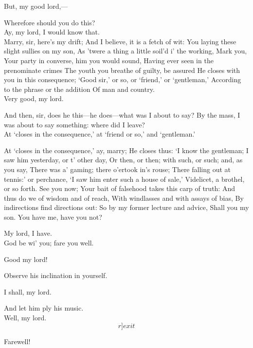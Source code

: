\documentclass[11pt]{book}
\begin{document}
	But, my good lord,---

\5	Wherefore should you do this?\\

	Ay, my lord,
	I would know that.\\

\5	                  Marry, sir, here's my drift;
	And I believe, it is a fetch of wit:
	You laying these slight sullies on my son,
	As 'twere a thing a little soil'd i' the working, Mark you,
	Your party in converse, him you would sound,
	Having ever seen in the prenominate crimes
	The youth you breathe of guilty, be assured
	He closes with you in this consequence;
	`Good sir,' or so, or `friend,' or `gentleman,'
	According to the phrase or the addition
	Of man and country.\\

	Very good, my lord.

\5	And then, sir, does he this---he does---what was I about to say?
   By the mass, I was about to say 	something:
   where did I leave?\\

	At `closes in the consequence,'
   at `friend or so,' and `gentleman.'

\5	At `closes in the consequence,' ay, marry;
	He closes thus: `I know the gentleman;
	I saw him yesterday, or t' other day,
	Or then, or then; with such, or such; and, as you say,
	There was a' gaming; there o'ertook in's rouse;
	There falling out at tennis:' or perchance,
	`I saw him enter such a house of sale,'
	Videlicet, a brothel, or so forth.
	See you now;
	Your bait of falsehood takes this carp of truth:
	And thus do we of wisdom and of reach,
	With windlasses and with assays of bias,
	By indirections find directions out:
	So by my former lecture and advice,
	Shall you my son. You have me, have you not?

	My lord, I have.\\

\5	                  God be wi' you; fare you well.

	Good my lord!

\5	Observe his inclination in yourself.

	I shall, my lord.

\5	And let him ply his music.\\

	Well, my lord. \[r]exit\]

\5	Farewell!\\
\end{document}
